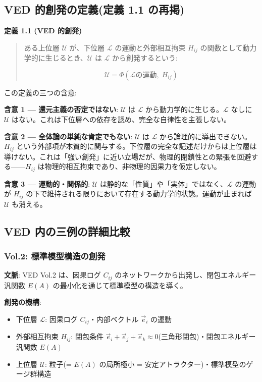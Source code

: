 \bigskip


\subsection{VED 的創発の定義(定義 1.1 の再掲)}


\textbf{定義 1.1 (VED 的創発)}

\begin{quote}
ある上位層 $\mathcal{U}$ が、下位層 $\mathcal{L}$ の運動と外部相互拘束 $H_{ij}$ の関数として動力学的に生じるとき、$\mathcal{U}$ は $\mathcal{L}$ から創発するという:

$$
\mathcal{U} = \Phi(\mathcal{L}\text{の運動}, \; H_{ij})
$$
\end{quote}


この定義の三つの含意:

\textbf{含意 1 — 還元主義の否定ではない}:
$\mathcal{U}$ は $\mathcal{L}$ から動力学的に生じる。$\mathcal{L}$ なしに $\mathcal{U}$ はない。これは下位層への依存を認め、完全な自律性を主張しない。

\textbf{含意 2 — 全体論の単純な肯定でもない}:
$\mathcal{U}$ は $\mathcal{L}$ から論理的に導出できない。$H_{ij}$ という外部項が本質的に関与する。下位層の完全な記述だけからは上位層は導けない。これは「強い創発」に近い立場だが、物理的閉鎖性との緊張を回避する——$H_{ij}$ は物理的相互拘束であり、非物理的因果力を仮定しない。

\textbf{含意 3 — 運動的・関係的}:
$\mathcal{U}$ は静的な「性質」や「実体」ではなく、$\mathcal{L}$ の運動が $H_{ij}$ の下で維持される限りにおいて存在する動力学的状態。運動が止まれば $\mathcal{U}$ も消える。

\bigskip


\subsection{VED 内の三例の詳細比較}


\subsubsection{Vol.2: 標準模型構造の創発}


\textbf{文脈}: VED Vol.2 は、因果ログ $C_{ij}$ のネットワークから出発し、閉包エネルギー汎関数 $E(A)$ の最小化を通じて標準模型の構造を導く。

\textbf{創発の機構}:
\begin{itemize}
\item 下位層 $\mathcal{L}$: 因果ログ $C_{ij}$・内部ベクトル $\vec{e}_i$ の運動
\item 外部相互拘束 $H_{ij}$: 閉包条件 $\vec{e}_i + \vec{e}_j + \vec{e}_k \approx 0$(三角形閉包)・閉包エネルギー汎関数 $E(A)$
\item 上位層 $\mathcal{U}$: 粒子(= $E(A)$ の局所極小 = 安定アトラクター)・標準模型のゲージ群構造
\end{itemize}


